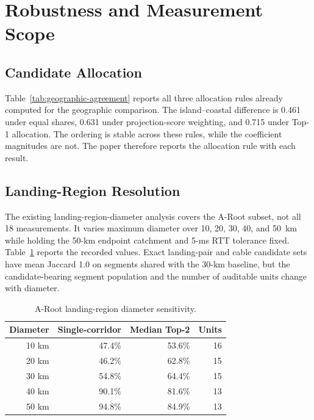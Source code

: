 \section{Robustness and Measurement Scope}
\label{sec:robustness}

\subsection{Candidate Allocation}

Table~\ref{tab:geographic-agreement} reports all three allocation rules already
computed for the geographic comparison. The island--coastal difference is
0.461 under equal shares, 0.631 under projection-score weighting, and 0.715
under Top-1 allocation. The ordering is stable across these rules, while the
coefficient magnitudes are not. The paper therefore reports the allocation
rule with each result.

\subsection{Landing-Region Resolution}

The existing landing-region-diameter analysis covers the A-Root subset, not all
18 measurements. It varies maximum diameter over 10, 20, 30, 40, and 50~km
while holding the 50-km endpoint catchment and 5-ms RTT tolerance fixed.
Table~\ref{tab:diameter-sensitivity} reports the recorded values. Exact
landing-pair and cable candidate sets have mean Jaccard 1.0 on segments shared
with the 30-km baseline, but the candidate-bearing segment population and the
number of auditable units change with diameter.

\begin{table}[t]
  \centering
  \caption{A-Root landing-region diameter sensitivity.}
  \label{tab:diameter-sensitivity}
  \footnotesize
  \setlength{\tabcolsep}{3.2pt}
  \begin{tabular}{rrrr}
    \toprule
    Diameter & Single-corridor & Median Top-2 & Units \\
    \midrule
    10 km & 47.4\% & 53.6\% & 16 \\
    20 km & 46.2\% & 62.8\% & 15 \\
    30 km & 54.8\% & 64.4\% & 15 \\
    40 km & 90.1\% & 81.6\% & 13 \\
    50 km & 94.8\% & 84.9\% & 13 \\
    \bottomrule
  \end{tabular}
\end{table}

